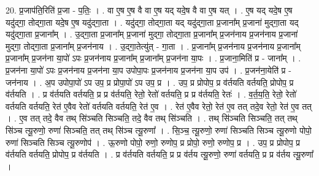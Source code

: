 \documentclass[17pt]{extarticle}
\begin{document}
20. प्र॒जाप॑ति॒रिति॑ प्र॒जा - प॒तिः॒ । . वा ए॒ष ए॒ष वै वा ए॒ष यद् यदे॒ष वै वा ए॒ष यत् । . ए॒ष यद् यदे॒ष ए॒ष यदु॑द्‍गा॒ तोद्‍गा॒ता यदे॒ष ए॒ष यदु॑द्‍गा॒ता । . यदु॑द्‍गा॒ तोद्‍गा॒ता यद् यदु॑द्‍गा॒ता प्र॒जाना᳚म् प्र॒जाना॑ मुद्‍गा॒ता यद् यदु॑द्‍गा॒ता प्र॒जाना᳚म् । . उ॒द्‍गा॒ता प्र॒जाना᳚म् प्र॒जाना॑ मुद्‍गा॒ तोद्‍गा॒ता प्र॒जाना᳚म् प्र॒जन॑नाय प्र॒जन॑नाय प्र॒जाना॑ मुद्‍गा॒ 
तोद्‍गा॒ता प्र॒जाना᳚म् प्र॒जन॑नाय । . उ॒द्‍गा॒तेत्यु॑त् - गा॒ता । . प्र॒जाना᳚म् प्र॒जन॑नाय प्र॒जन॑नाय प्र॒जाना᳚म् प्र॒जाना᳚म् प्र॒जन॑ना या॒पो॑ ऽपः प्र॒जन॑नाय प्र॒जाना᳚म् प्र॒जाना᳚म् प्र॒जन॑ना या॒पः । . प्र॒जाना॒मिति॑ प्र - जाना᳚म् । . प्र॒जन॑ना या॒पो॑ ऽपः प्र॒जन॑नाय प्र॒जन॑ना या॒प उपोपा॒पः प्र॒जन॑नाय प्र॒जन॑ना या॒प उप॑ । . प्र॒जन॑ना॒येति॑ प्र - जन॑नाय । . अ॒प उपोपा॒पो॑ ऽप उप॒ प्र प्रोपा॒पो॑ ऽप उप॒ प्र । . उप॒ प्र प्रोपोप॒ प्र व॑र्तयति वर्तयति॒ प्रोपोप॒ प्र व॑र्तयति । . प्र व॑र्तयति वर्तयति॒ प्र प्र व॑र्तयति॒ रेतो॒ रेतो॑ वर्तयति॒ प्र प्र व॑र्तयति॒ रेतः॑ । . व॒र्त॒य॒ति॒ रेतो॒ रेतो॑ वर्तयति वर्तयति॒ रेत॑ ए॒वैव रेतो॑ वर्तयति वर्तयति॒ रेत॑ ए॒व । . रेत॑ ए॒वैव रेतो॒ रेत॑ ए॒व तत् तदे॒व रेतो॒ रेत॑ ए॒व तत् । . ए॒व तत् तदे॒ वैव तथ् सि॑ञ्चति सिञ्चति॒ तदे॒ वैव तथ् सि॑ञ्चति । . तथ् सि॑ञ्चति सिञ्चति॒ तत् तथ् सि॑ञ्च त्यू॒रुणो॒ रुणा॑ सिञ्चति॒ तत् तथ् सि॑ञ्च त्यू॒रुणा᳚ । . सि॒ञ्च॒ त्यू॒रुणो॒ रुणा॑ सिञ्चति सिञ्च त्यू॒रुणो पोपो॒ रुणा॑ सिञ्चति सिञ्च त्यू॒रुणोप॑ । . ऊ॒रुणो पोपो॒ रुणो॒ रुणोप॒ प्र प्रोपो॒ रुणो॒ रुणोप॒ प्र । . उप॒ प्र प्रोपोप॒ प्र व॑र्तयति वर्तयति॒ प्रोपोप॒ प्र व॑र्तयति । . प्र व॑र्तयति वर्तयति॒ प्र प्र व॑र्तय त्यू॒रुणो॒ रुणा॑ वर्तयति॒ प्र प्र व॑र्तय त्यू॒रुणा᳚ । \newline
\end{document}

